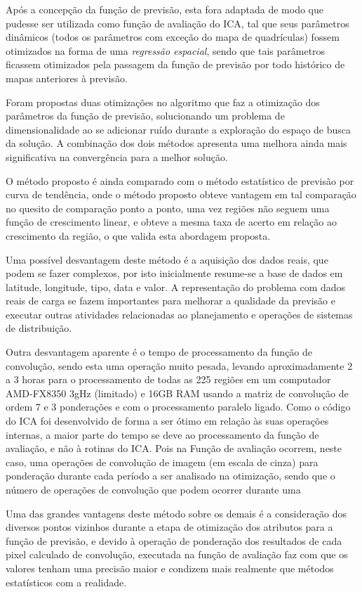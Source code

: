 Após a concepção da função de previsão, esta fora adaptada de modo que pudesse ser utilizada como função de avaliação do ICA, tal que seus parâmetros dinâmicos (todos os parâmetros com exceção do mapa de quadrículas) fossem otimizados na forma de uma \emph{regressão espacial}, sendo que tais parâmetros ficassem otimizados pela passagem da função de previsão por todo histórico de mapas anteriores à previsão. 

Foram propostas duas otimizações no algoritmo que faz a otimização dos parâmetros da função de previsão, solucionando um problema de dimensionalidade ao se adicionar ruído durante a exploração do espaço de busca da solução. A combinação dos dois métodos apresenta uma melhora ainda mais significativa na convergência para a melhor solução. 

O método proposto é ainda comparado com o método estatístico de previsão por curva de tendência, onde o método proposto obteve vantagem em tal comparação no quesito de comparação ponto a ponto, uma vez regiões não seguem uma função de crescimento linear, e obteve a mesma taxa de acerto em relação ao crescimento da região, o que valida esta abordagem proposta.

Uma possível desvantagem deste método é a aquisição dos dados reais, que podem se fazer complexos, por isto inicialmente resume-se a base de dados em latitude, longitude, tipo, data e valor. A representação do problema com dados reais de carga se fazem importantes para melhorar a qualidade da previsão e executar outras atividades relacionadas ao planejamento e operações de sistemas de distribuição. 

Outra desvantagem aparente é o tempo de processamento da função de convolução, sendo esta uma operação muito pesada, levando aproximadamente 2 a 3 horas para o processamento de todas as 225 regiões em um computador AMD-FX8350 3gHz (limitado) e 16GB RAM usando a matriz de convolução de ordem 7 e 3 ponderações e com o processamento paralelo ligado. Como o código do ICA foi desenvolvido de forma a ser ótimo em relação às suas operações internas, a maior parte do tempo se deve ao processamento da função de avaliação, e não à rotinas do ICA. Pois na Função de avaliação ocorrem, neste caso, uma operações de convolução de imagem (em escala de cinza) para ponderação durante cada período a ser analisado na otimização, sendo que o número de operações de convolução que podem ocorrer durante uma 

Uma das grandes vantagens deste método sobre os demais é a consideração dos diversos pontos vizinhos durante a etapa de otimização dos atributos para a função de previsão, e devido à operação de ponderação dos resultados de cada pixel calculado de convolução, executada na função de avaliação faz com que os valores tenham uma precisão maior e condizem mais realmente que métodos estatísticos com a realidade. 

